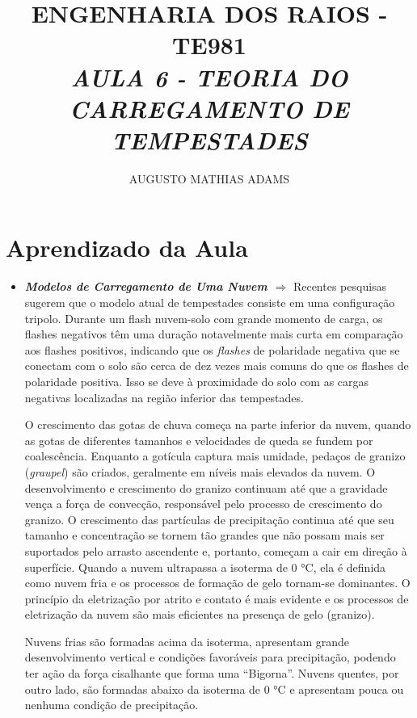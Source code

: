 \documentclass[a4paper, 12pt, onecolumn,singlespacing]{article}
\title{\normalsize{ENGENHARIA DOS RAIOS - TE981}\\ \huge{\textbf\textit{{AULA 6 - TEORIA DO CARREGAMENTO DE TEMPESTADES}}\\}}
\author{\small{AUGUSTO MATHIAS ADAMS}}
\begin{document}
	
	\maketitle
	
	\section{Aprendizado da Aula}
	
	\begin{itemize}
		
		\item \textbf{\textit{Modelos de Carregamento de Uma Nuvem $\Rightarrow$ }}Recentes pesquisas sugerem que o modelo atual de tempestades consiste em uma configuração tripolo. Durante um flash nuvem-solo com grande momento de carga, os flashes negativos têm uma duração notavelmente mais curta em comparação aos flashes positivos, indicando que os \textit{flashes} de polaridade negativa que se conectam com o solo são cerca de dez vezes mais comuns do que os flashes de polaridade positiva. Isso se deve à proximidade do solo com as cargas negativas localizadas na região inferior das tempestades.
		
		O crescimento das gotas de chuva começa na parte inferior da nuvem, quando as gotas de diferentes tamanhos e velocidades de queda se fundem por coalescência. Enquanto a gotícula captura mais umidade, pedaços de granizo (\textit{graupel}) são criados, geralmente em níveis mais elevados da nuvem. O desenvolvimento e crescimento do granizo continuam até que a gravidade vença a força de convecção, responsável pelo processo de crescimento do granizo. O crescimento das partículas de precipitação continua até que seu tamanho e concentração se tornem tão grandes que não possam mais ser suportados pelo arrasto ascendente e, portanto, começam a cair em direção à superfície. Quando a nuvem ultrapassa a isoterma de 0 °C, ela é definida como nuvem fria e os processos de formação de gelo tornam-se dominantes. O princípio da eletrização por atrito e contato é mais evidente e os processos de eletrização da nuvem são mais eficientes na presença de gelo (granizo).
		
		Nuvens frias são formadas acima da isoterma, apresentam grande desenvolvimento vertical e condições favoráveis para precipitação, podendo ter ação da força cisalhante que forma uma ``Bigorna''. Nuvens quentes, por outro lado, são formadas abaixo da isoterma de 0 °C e apresentam pouca ou nenhuma condição de precipitação.
		

\end{itemize}
\end{document}
